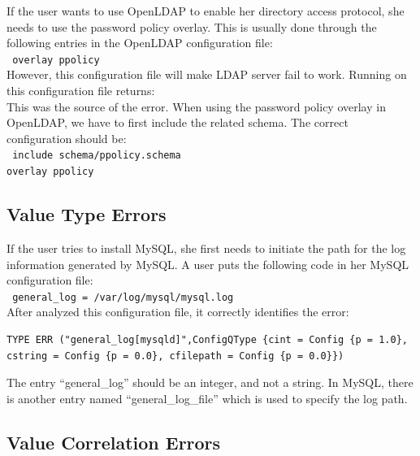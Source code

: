 If the user wants to use OpenLDAP to enable her directory access
protocol, she needs to use the password policy overlay. This is usually
done through the following entries in the OpenLDAP configuration file:\\
\texttt{
 \hspace*{3em}overlay ppolicy\\}
However, this configuration file will make LDAP server fail to work.
Running \app on this configuration file returns:
\\
This was the source of the error. When using the password policy overlay
in OpenLDAP, we have to first include the related schema. The correct configuration should be:\\
\texttt{
 \hspace*{3em}include schema/ppolicy.schema\\
 \hspace*{3em}overlay ppolicy\\
}

\subsection{Value Type Errors}

If the user tries to install MySQL, she first needs to 
initiate the path for the
log information generated by MySQL. A user puts the following code in 
her MySQL configuration file:\\
\texttt{
 \hspace*{3em}general\_log = /var/log/mysql/mysql.log\\}
After \app analyzed this configuration file, it correctly identifies the error:
\begin{verbatim}
TYPE ERR ("general_log[mysqld]",ConfigQType {cint = Config {p = 1.0}, cstring = Config {p = 0.0}, cfilepath = Config {p = 0.0}})
\end{verbatim}
The entry ``general\_log'' should be an integer, 
and not a string. In MySQL, there is another entry named
``general\_log\_file'' which is used to specify the log path.  

\subsection{Value Correlation Errors}

